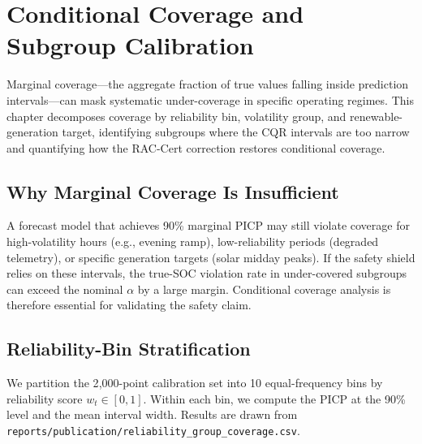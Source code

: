 
\chapter{Conditional Coverage and Subgroup Calibration}
\label{ch:conditional-coverage}

Marginal coverage---the aggregate fraction of true values falling
inside prediction intervals---can mask systematic under-coverage in
specific operating regimes.  This chapter decomposes coverage by
reliability bin, volatility group, and renewable-generation target,
identifying subgroups where the CQR intervals are too narrow and
quantifying how the RAC-Cert correction restores conditional coverage.

\section{Why Marginal Coverage Is Insufficient}

A forecast model that achieves 90\% marginal PICP may still violate
coverage for high-volatility hours (e.g., evening ramp), low-reliability
periods (degraded telemetry), or specific generation targets (solar
midday peaks).  If the safety shield relies on these intervals, the
true-SOC violation rate in under-covered subgroups can exceed the
nominal $\alpha$ by a large margin.  Conditional coverage analysis
is therefore essential for validating the safety claim.

\section{Reliability-Bin Stratification}

We partition the 2{,}000-point calibration set into 10 equal-frequency
bins by reliability score $w_t \in [0, 1]$.  Within each bin, we
compute the PICP at the 90\% level and the mean interval width.
Results are drawn from
\texttt{reports/publication/reliability\_group\_coverage.csv}.

